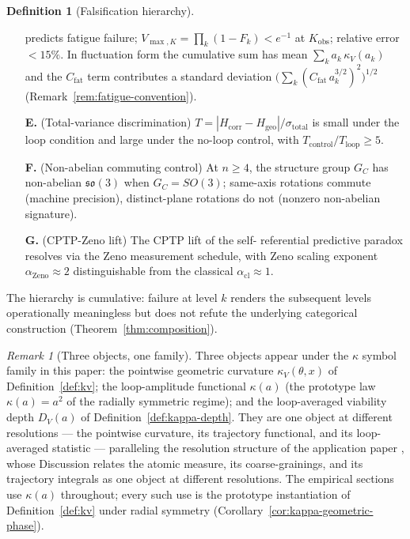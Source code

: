 \documentclass[11pt,a4paper]{article}
\theoremstyle{plain}
\theoremstyle{definition}
\newtheorem{definition}[theorem]{Definition}
\theoremstyle{remark}
\newtheorem{remark}[theorem]{Remark}
\newcommand{\kk}{\kappa_{\!V}}
\newcommand{\so}{\mathfrak{so}}
\begin{document}
\begin{definition}[Falsification hierarchy]
\begin{itemize}[leftmargin=1.2em,itemsep=2pt]
predicts fatigue failure; $V_{\max,K}=\prod_k(1-F_k)<e^{-1}$ at
$K_{\mathrm{obs}}$; relative error $<15\%$. In fluctuation form the
cumulative sum has mean $\sum_k a_k\,\kk(a_k)$ and the
$C_{\mathrm{fat}}$ term contributes a standard deviation
$\bigl(\sum_k (C_{\mathrm{fat}}\,a_k^{3/2})^{2}\bigr)^{1/2}$
(Remark~\ref{rem:fatigue-convention}).
\item[\textbf{E.}] (Total-variance discrimination) $T =
|H_{\mathrm{corr}}-H_{\mathrm{geo}}|/\sigma_{\mathrm{total}}$ is small
under the loop condition and large under the no-loop control, with
$T_{\mathrm{control}}/T_{\mathrm{loop}}\geq 5$.
\item[\textbf{F.}] (Non-abelian commuting control) At $n\geq 4$, the
structure group $G_C$ has non-abelian $\so(3)$ when $G_C = SO(3)$; same-axis
rotations commute (machine precision), distinct-plane rotations do not
(nonzero non-abelian signature).
\item[\textbf{G.}] (CPTP-Zeno lift) The CPTP lift of the self-
referential predictive paradox resolves via the Zeno measurement
schedule, with Zeno scaling exponent $\alpha_{\mathrm{Zeno}}\approx 2$
distinguishable from the classical $\alpha_{\mathrm{cl}}\approx 1$.
\end{itemize}
\end{definition}

The hierarchy is cumulative: failure at level $k$ renders the
subsequent levels operationally meaningless but does not refute the
underlying categorical construction (Theorem~\ref{thm:composition}).

\begin{remark}[Three objects, one family]
\label{rem:kappa-family}
Three objects appear under the $\kappa$ symbol family in this paper:
the pointwise geometric curvature $\kk(\theta,x)$ of
Definition~\ref{def:kv}; the loop-amplitude functional $\kappa(a)$
(the prototype law $\kappa(a)=a^{2}$ of the radially symmetric
regime); and the loop-averaged viability depth $D_V(a)$ of
Definition~\ref{def:kappa-depth}. They are one object at different
resolutions --- the pointwise curvature, its trajectory functional,
and its loop-averaged statistic --- paralleling the resolution
structure of the application paper \citep{zai2026measure},
whose Discussion relates the atomic measure, its coarse-grainings,
and its trajectory integrals as one object at different
resolutions. The empirical sections use $\kappa(a)$ throughout;
every such use is the prototype instantiation of
Definition~\ref{def:kv} under radial symmetry
(Corollary~\ref{cor:kappa-geometric-phase}).
\end{remark}
\end{document}
